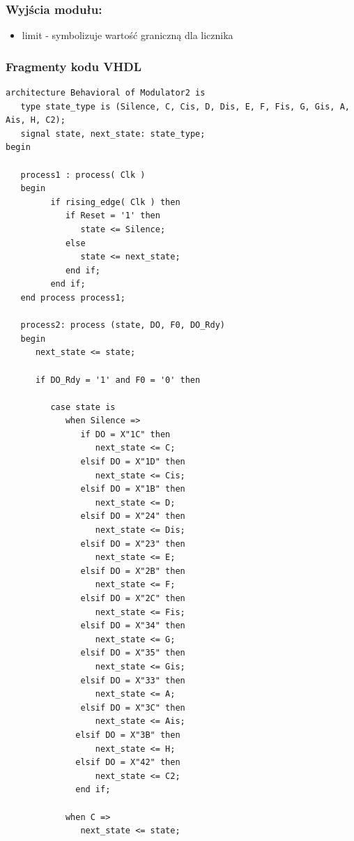 \documentclass[a4paper,11pt]{article}
\begin{document}
\subsubsection*{Wyjścia modułu:}
\begin{itemize}
\item limit - symbolizuje wartość graniczną dla licznika
\end{itemize}

\subsubsection*{Fragmenty kodu VHDL}
\begin{lstlisting}[caption=Procesy modułu Modulator2.]
architecture Behavioral of Modulator2 is
   type state_type is (Silence, C, Cis, D, Dis, E, F, Fis, G, Gis, A, Ais, H, C2);
   signal state, next_state: state_type;
begin

   process1 : process( Clk )
   begin
         if rising_edge( Clk ) then
            if Reset = '1' then
               state <= Silence;
            else
               state <= next_state;
            end if;
         end if;
   end process process1;
   
   process2: process (state, DO, F0, DO_Rdy)
   begin
      next_state <= state;
      
      if DO_Rdy = '1' and F0 = '0' then
      
         case state is
            when Silence =>
               if DO = X"1C" then
                  next_state <= C;
               elsif DO = X"1D" then
                  next_state <= Cis;
               elsif DO = X"1B" then
                  next_state <= D;
               elsif DO = X"24" then
                  next_state <= Dis;
               elsif DO = X"23" then
                  next_state <= E;
               elsif DO = X"2B" then
                  next_state <= F;
               elsif DO = X"2C" then
                  next_state <= Fis;
               elsif DO = X"34" then
                  next_state <= G;
               elsif DO = X"35" then
                  next_state <= Gis;
               elsif DO = X"33" then
                  next_state <= A;
               elsif DO = X"3C" then
                  next_state <= Ais;
              elsif DO = X"3B" then
                  next_state <= H;
              elsif DO = X"42" then
                  next_state <= C2;
              end if;
              
            when C =>
               next_state <= state;
               

\end{lstlisting}
\end{document}
